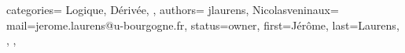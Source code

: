 {
  categories={
    Logique,
    Dérivée,
  },
  authors={
    jlaurens, Nicolasveninaux={
      mail=jerome.laurens@u-bourgogne.fr,
      status=owner,
      first=Jérôme,
      last=Laurens,
    },
  },
}
